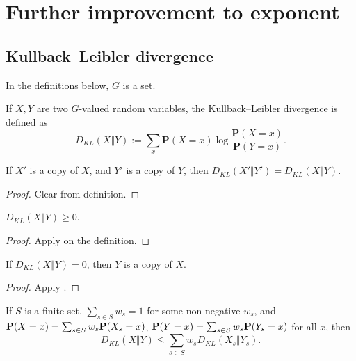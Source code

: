 \chapter{Further improvement to exponent}

\section{Kullback--Leibler divergence}

In the definitions below, $G$ is a set.

\begin{definition}\label{kl-div}\leanok If $X,Y$ are two $G$-valued random variables, the Kullback--Leibler divergence is defined as
  $$ D_{KL}(X\Vert Y) := \sum_x \mathbf{P}(X=x) \log \frac{\mathbf{P}(X=x)}{\mathbf{P}(Y=x)}.$$
\end{definition}

\begin{lemma}\label{kl-div-copy}\leanok  If $X'$ is a copy of $X$, and $Y'$ is a copy of $Y$, then $D_{KL}(X'\Vert Y') = D_{KL}(X\Vert Y)$.
\end{lemma}

\begin{proof}  Clear from definition.
\end{proof}

\begin{lemma}\label{Gibbs}\leanok  $D_{KL}(X\Vert Y) \geq 0$.
\end{lemma}

\begin{proof}
  Apply  on the definition.
\end{proof}

\begin{lemma}\label{Gibbs-converse}\leanok  If $D_{KL}(X\Vert Y) = 0$, then $Y$ is a copy of $X$.
\end{lemma}

\begin{proof}
  Apply .
\end{proof}

\begin{lemma}\label{kl-div-convex}\leanok  If $S$ is a finite set, $\sum_{s \in S} w_s = 1$ for some non-negative $w_s$, and ${\bf P}(X=x) = \sum_{s\in S} w_s  {\bf P}(X_s=x)$, ${\bf P}(Y=x) = \sum_{s\in S} w_s  {\bf P}(Y_s=x)$ for all $x$, then
$$D_{KL}(X\Vert Y) \le \sum_{s\in S} w_s D_{KL}(X_s\Vert Y_s).$$
\end{lemma}

